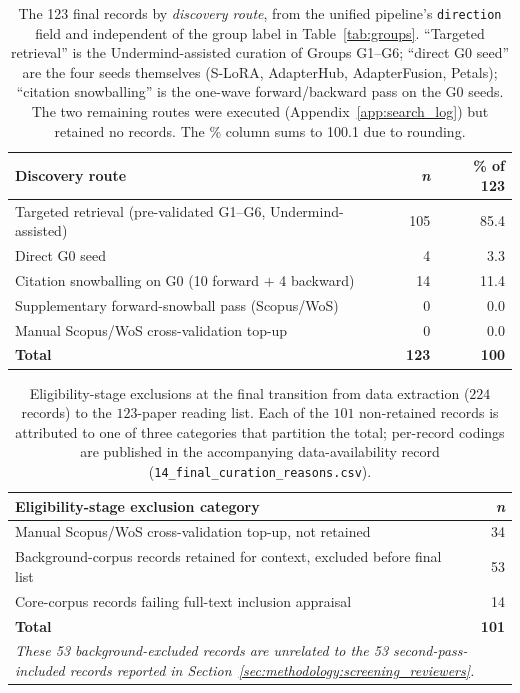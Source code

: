 \begin{table}[H]
\centering
\caption{The 123 final records by \emph{discovery route}, from the unified
pipeline's \texttt{direction} field and independent of the group label in
Table~\ref{tab:groups}. ``Targeted retrieval'' is the Undermind-assisted
curation of Groups G1--G6; ``direct G0 seed'' are the four seeds themselves
(S-LoRA, AdapterHub, AdapterFusion, Petals); ``citation snowballing'' is the
one-wave forward/backward pass on the G0 seeds. The two remaining routes were
executed (Appendix~\ref{app:search_log}) but retained no records. The \%
column sums to 100.1 due to rounding.}
\label{tab:discovery_route}
\begin{tabular}{lrr}
\toprule
\textbf{Discovery route} & \textbf{\textit{n}} & \textbf{\% of 123} \\
\midrule
Targeted retrieval (pre-validated G1--G6, Undermind-assisted) & 105 & 85.4 \\
Direct G0 seed & 4 & 3.3 \\
Citation snowballing on G0 (10 forward $+$ 4 backward) & 14 & 11.4 \\
Supplementary forward-snowball pass (Scopus/WoS) & 0 & 0.0 \\
Manual Scopus/WoS cross-validation top-up & 0 & 0.0 \\
\midrule
\textbf{Total} & \textbf{123} & \textbf{100} \\
\bottomrule
\end{tabular}
\end{table}

\begin{table}[H]
\centering
\caption{Eligibility-stage exclusions at the final transition from data
extraction ($224$ records) to the $123$-paper reading list. Each of the $101$
non-retained records is attributed to one of three categories that partition
the total; per-record codings are published in the accompanying data-availability
record (\texttt{14\_final\_curation\_reasons.csv}).}
\label{tab:final_exclusions}
\small
\setlength{\tabcolsep}{4pt}
\begin{tabular}{lr}
\toprule
\textbf{Eligibility-stage exclusion category} & \textbf{\textit{n}} \\
\midrule
Manual Scopus/WoS cross-validation top-up, not retained & 34 \\
Background-corpus records retained for context, excluded before final list & 53 \\
Core-corpus records failing full-text inclusion appraisal & 14 \\
\midrule
\textbf{Total} & \textbf{101} \\
\bottomrule
\multicolumn{2}{p{0.95\linewidth}}{\footnotesize\emph{These 53
background-excluded records are unrelated to the 53 second-pass-included
records reported in Section~\ref{sec:methodology:screening_reviewers}.}} \\
\end{tabular}
\end{table}

